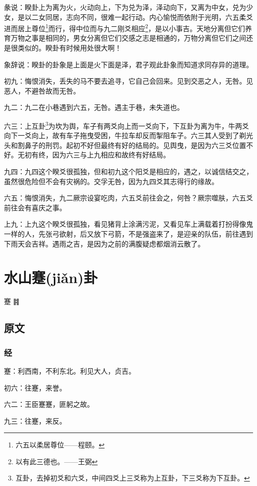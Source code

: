 \documentclass[12pt,oneside]{book}
\begin{document}
彖说：睽卦上为离为火，火动向上，下为兑为泽，泽动向下，又离为中女，兑为少女，是以二女同居，志向不同，很难一起行动。内心愉悦而依附于光明，六五柔爻进而居上尊位\footnote{六五以柔居尊位——程颐。}而行，得中位而与九二刚爻相应\footnote{以有此三德也。——王弼}，是以小事吉。天地分离但它们养育万物之事是相同的，男女分离但它们交感之志是相通的，万物分离但它们之间还是很类似的。睽卦有时候用处很大啊！

象辞说：睽卦的卦象是上面是火下面是泽，君子观此卦象而知道求同存异的道理。


初九：悔恨消失，丢失的马不要去追寻，它自己会回来。见到交恶之人，无咎。见恶人，不避咎故而无咎。

九二：九二在小巷遇到六五，无咎。遇主于巷，未失道也。

六三：上互卦\footnote{互卦，去掉初爻和六爻，中间四爻上三爻称为上互卦，下三爻称为下互卦。}为坎为舆，车子有两爻向上而一爻向下，下互卦为离为牛，牛两爻向下一爻向上，故有车子拖曳受困，牛拉车却反而掣阻车子。六三其人受到了剃光头和割鼻子的刑罚。起初不好但最终有好的结局的。见舆曳，是因为六三爻位置不好。无初有终，因为六三与上九相应和故终有好结局。

九四：九四这个睽爻很孤独，但和初九这个阳爻是相应的，遇之，以诚信结交之，虽然很危险但不会有灾祸的。交孚无咎，因为九四爻其志得行的缘故。

六五：悔恨消失，九二厥宗设宴吃肉，六五爻前往会之，何咎？厥宗噬肤，六五爻前往会有喜庆之事。

上九：上九这个睽爻很孤独，看见猪背上涂满污泥，又看见车上满载着打扮得像鬼一样的人，先张弓欲射，后又放下弓箭，不是强盗来了，是迎亲的队伍，前往遇到下雨天会吉祥。遇雨之吉，是因为之前的满腹疑虑都烟消云散了。


\chapter{水山蹇(jiǎn)卦}
蹇 {\Large ䷦}

\section{原文}

\subsection{经}
蹇：利西南，不利东北。利见大人，贞吉。

初六：往蹇，来誉。

六二：王臣蹇蹇，匪躬之故。

九三：往蹇，来反。
\end{document}
